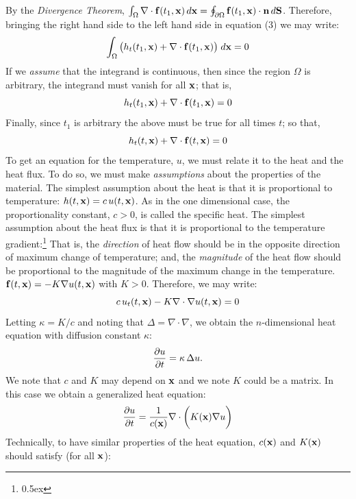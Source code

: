 By the {\it Divergence Theorem\/},
$\int_{\Omega} \nabla \cdot {\bf f}(t_1, {\bf x}) \, d{\bf x} =
\oint_{\partial \Omega} {\bf f}(t_1, {\bf x}) \cdot {\bf n} \, d{\bf S}$.
Therefore, bringing the right hand side to the left hand side in equation 
(3) we may write:
$$
\int_{\Omega} \big( h_t(t_1, {\bf x}) + \nabla \cdot {\bf f}(t_1, {\bf x}) \big)
\; d{\bf x} = 0
$$
If we {\it assume\/} that the integrand is continuous, then since the
region $\Omega$ is arbitrary, the integrand must vanish for all ${\bf x}$;
that is,
$$
h_t(t_1, {\bf x}) + \nabla \cdot {\bf f}(t_1, {\bf x}) = 0
$$
Finally, since $t_1$ is arbitrary the above must be true for all times $t$;
so that,
$$
h_t(t, {\bf x}) + \nabla \cdot {\bf f}(t, {\bf x}) = 0
$$
To get an equation for the temperature, $u$, we must relate it to 
the heat and the heat flux. To do so, we must make 
{\it assumptions\/} about the properties of the material. The simplest 
assumption about the heat is that it is proportional to
temperature:
$h(t,{\bf x}) = c \, u(t,{\bf x})$. 
As in the one dimensional case, the proportionality constant, $c > 0$, 
is called the specific heat. 
The simplest assumption about the heat flux is that it is proportional 
to the temperature gradient:\footnote{\kern 1pt \raise 0.5ex \hbox{\ddag}}
{That is, the {\it direction\/} of heat 
flow should be in the opposite direction of maximum change of temperature;
and, the {\it magnitude\/} of the heat flow should be proportional to the 
magnitude of the maximum change in the temperature.} 
${\bf f}(t,{\bf x}) = - K \nabla u(t,{\bf x})$ with $K > 0$. 
Therefore, we may write:
$$
c \, u_t(t, {\bf x}) - K \nabla \cdot \nabla u(t, {\bf x}) = 0
$$
Letting $\kappa = K / c$ and noting that $\Delta = \nabla \cdot \nabla$, 
we obtain the $n$-dimensional heat equation with diffusion constant $\kappa$:
$$
{{\displaystyle \partial u} \over {\displaystyle \partial t}} =  \kappa \, \Delta u.
$$
We note that $c$ and $K$ may depend on ${\bf x}$ and we note $K$ could be 
a matrix. In this case we obtain a generalized heat equation:
$$
{{\displaystyle \partial u} \over {\displaystyle \partial t}} = {{\displaystyle 1} \over {\displaystyle c({\bf x})}} 
\nabla \cdot \bigg(K({\bf x}) \nabla u \bigg)
$$
Technically, to have similar properties of the heat equation, $c({\bf x})$
and $K({\bf x})$ should satisfy (for all ${\bf x}$):

\beginEnum
{}
\endEnum


